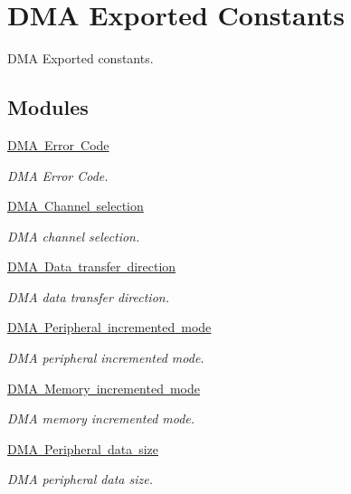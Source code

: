 \hypertarget{group___d_m_a___exported___constants}{}\section{D\+MA Exported Constants}
\label{group___d_m_a___exported___constants}


D\+MA Exported constants.  


\subsection*{Modules}
\begin{DoxyCompactItemize}
\item 
\mbox{\hyperlink{group___d_m_a___error___code}{D\+M\+A Error Code}}
\begin{DoxyCompactList}\small\item\em D\+MA Error Code. \end{DoxyCompactList}\item 
\mbox{\hyperlink{group___d_m_a___channel__selection}{D\+M\+A Channel selection}}
\begin{DoxyCompactList}\small\item\em D\+MA channel selection. \end{DoxyCompactList}\item 
\mbox{\hyperlink{group___d_m_a___data__transfer__direction}{D\+M\+A Data transfer direction}}
\begin{DoxyCompactList}\small\item\em D\+MA data transfer direction. \end{DoxyCompactList}\item 
\mbox{\hyperlink{group___d_m_a___peripheral__incremented__mode}{D\+M\+A Peripheral incremented mode}}
\begin{DoxyCompactList}\small\item\em D\+MA peripheral incremented mode. \end{DoxyCompactList}\item 
\mbox{\hyperlink{group___d_m_a___memory__incremented__mode}{D\+M\+A Memory incremented mode}}
\begin{DoxyCompactList}\small\item\em D\+MA memory incremented mode. \end{DoxyCompactList}\item 
\mbox{\hyperlink{group___d_m_a___peripheral__data__size}{D\+M\+A Peripheral data size}}
\begin{DoxyCompactList}\small\item\em D\+MA peripheral data size. \end{DoxyCompactList}\item 

\end{DoxyCompactItemize}
